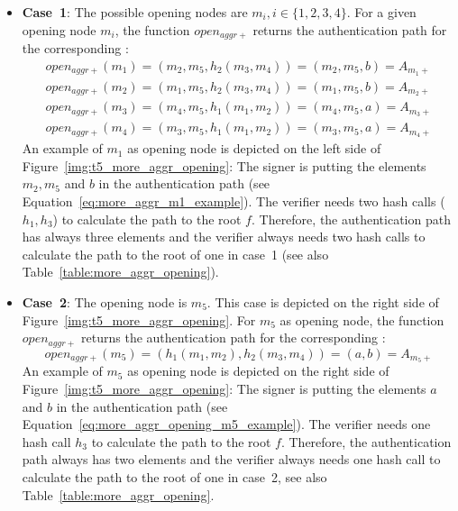 \begin{itemize}
\label{list:case1_case_2}
\item \textbf{Case~1}: The possible opening nodes are $m_i, i \in \{1,2,3,4\}$. For a given opening node $m_i$, the function $open_{aggr+}$ returns the authentication path for the corresponding \tfblock:
\begin{align}
open_{aggr+}(m_1) = (m_2, m_5, h_2(m_3, m_4)) = (m_2, m_5, b) = A_{m_1+} \label{eq:more_aggr_m1_example} \\
open_{aggr+}(m_2) = (m_1, m_5, h_2(m_3, m_4)) = (m_1, m_5, b) = A_{m_2+} \\
open_{aggr+}(m_3) = (m_4, m_5, h_1(m_1, m_2)) = (m_4, m_5, a) = A_{m_3+} \\
open_{aggr+}(m_4) = (m_3, m_5, h_1(m_1, m_2)) = (m_3, m_5, a) = A_{m_4+} \label{eq:more_aggr_m4_example}
\end{align} 
An example of $m_1$ as opening node is depicted on the left side of Figure~\ref{img:t5_more_aggr_opening}: The signer is putting the elements $m_2, m_5$ and $b$ in the authentication path (see Equation~\ref{eq:more_aggr_m1_example}). The verifier needs two hash calls ($h_1, h_3$) to calculate the path to the root $f$.
Therefore, the authentication path has always three elements and the verifier always needs two hash calls to calculate the path to the root of one \tfblock in case~1 (see also Table~\ref{table:more_aggr_opening}).

\item \textbf{Case~2}: The opening node is $m_5$. This case is depicted on the right side of Figure~\ref{img:t5_more_aggr_opening}. For $m_5$ as opening node, the function $open_{aggr+}$ returns the authentication path for the corresponding \tfblock:
\begin{equation}
\label{eq:more_aggr_opening_m5_example}
open_{aggr+}(m_5) = (h_1(m_1, m_2), h_2(m_3, m_4)) = (a, b) = A_{m_5+}
\end{equation}
An example of $m_5$ as opening node is depicted on the right side of Figure~\ref{img:t5_more_aggr_opening}: The signer is putting the elements $a$ and $b$ in the authentication path (see Equation~\ref{eq:more_aggr_opening_m5_example}). The verifier needs one hash call $h_3$ to calculate the path to the root $f$.
Therefore, the authentication path always has two elements and the verifier always needs one hash call to calculate the path to the root of one \tfblock in case~2, see also Table~\ref{table:more_aggr_opening}.
\end{itemize} 

